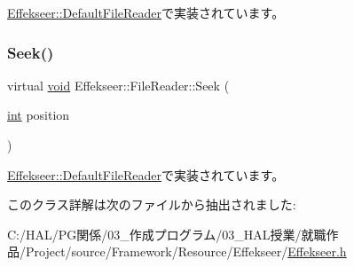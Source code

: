 \mbox{\hyperlink{class_effekseer_1_1_default_file_reader_ae00fd8b1031e13bd5a43d74f03d7ed79}{Effekseer\+::\+Default\+File\+Reader}}で実装されています。

\mbox{\label{class_effekseer_1_1_file_reader_a5daeb98049f994bccf874b2374e36a25}} 
\subsubsection{\texorpdfstring{Seek()}{Seek()}}
{\footnotesize\ttfamily virtual \mbox{\hyperlink{namespace_effekseer_ab34c4088e512200cf4c2716f168deb56}{void}} Effekseer\+::\+File\+Reader\+::\+Seek (\begin{DoxyParamCaption}\item[{\mbox{\hyperlink{namespace_effekseer_ace0abf7c2e6947e519ebe8b54cbcc30a}{int}}}]{position }\end{DoxyParamCaption})\hspace{0.3cm}{\ttfamily [pure virtual]}}



\mbox{\hyperlink{class_effekseer_1_1_default_file_reader_a9c9e821e4508708a2c91a9ab486b2709}{Effekseer\+::\+Default\+File\+Reader}}で実装されています。



このクラス詳解は次のファイルから抽出されました\+:\begin{DoxyCompactItemize}
\item 
C\+:/\+H\+A\+L/\+P\+G関係/03\+\_\+作成プログラム/03\+\_\+\+H\+A\+L授業/就職作品/\+Project/source/\+Framework/\+Resource/\+Effekseer/\mbox{\hyperlink{_effekseer_8h}{Effekseer.\+h}}\end{DoxyCompactItemize}
